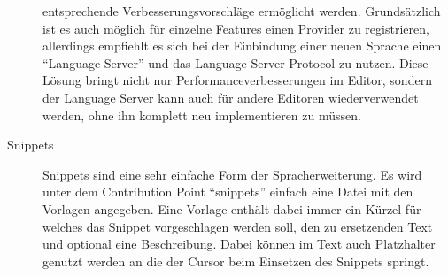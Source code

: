 \begin{description}
      entsprechende Verbesserungsvorschläge ermöglicht werden. Grundsätzlich ist es auch möglich für einzelne
      Features einen Provider zu registrieren, allerdings empfiehlt es sich bei der Einbindung einer neuen
      Sprache einen \enquote{Language Server} und das Language Server Protocol zu nutzen. Diese Lösung
      bringt nicht nur Performanceverbesserungen im Editor, sondern der Language Server kann auch für 
      andere Editoren wiederverwendet werden, ohne ihn komplett neu implementieren zu müssen.
    \item[Snippets] 
      Snippets sind eine sehr einfache Form der Spracherweiterung. Es wird unter dem Contribution Point
      \enquote{snippets} einfach eine Datei mit den Vorlagen angegeben. Eine Vorlage enthält dabei immer
      ein Kürzel für welches das Snippet vorgeschlagen werden soll, den zu ersetzenden Text und optional
      eine Beschreibung. Dabei können im Text auch Platzhalter genutzt werden an die der Cursor beim Einsetzen
      des Snippets springt.
  \end{description}
